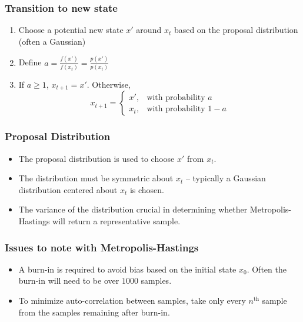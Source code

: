 \begin{frame}
  \frametitle{Transition to new state}
  \begin{enumerate}
    \item Choose a potential new state $x'$ around $x_t$ based on the proposal
      distribution (often a Gaussian)
    \item Define $a = \frac{f(x')}{f(x_t)} = \frac{p(x')}{p(x_t)}$
    \item If $a \geq 1$, $x_{t+1} = x'$. Otherwise, 
      \[x_{t+1} = 
      \begin{cases}
        x', & \text{with probability } a \\
        x_t, & \text{with probability } 1 - a
      \end{cases}\]
  \end{enumerate}
\end{frame}

\begin{frame}
  \frametitle{Proposal Distribution}
  \begin{itemize}
  \item The proposal distribution is used to choose $x'$ from $x_t$.
  \item The distribution must be symmetric about $x_t$ -- typically a
    Gaussian distribution centered about $x_t$ is chosen.
  \item The variance of the distribution crucial in determining whether
    Metropolis-Hastings will return a representative sample.
  \end{itemize}
\end{frame}

\begin{frame}
  \frametitle{Issues to note with Metropolis-Hastings}
  \begin{itemize}
    \item A burn-in is required to avoid bias based on the initial state $x_0$.
      Often the burn-in will need to be over $1000$ samples.
    \item To minimize auto-correlation between samples, take only every $n^{\text{th}}$
      sample from the samples remaining after burn-in.
  \end{itemize}
\end{frame}
